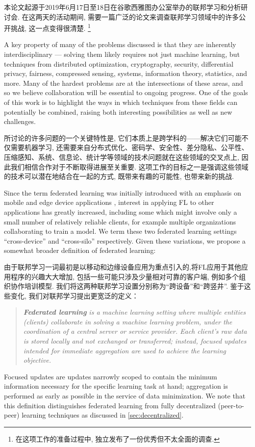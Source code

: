 本论文起源于2019年6月17日至18日在谷歌西雅图办公室举办的联邦学习和分析研讨会. 在这两天的活动期间, 需要一篇广泛的论文来调查联邦学习领域中的许多公开挑战, 这一点变得很清楚. \footnote{在这项工作的准备过程中, \citet{li2019federated}独立发布了一份优秀但不太全面的调查. }


A key property of many of the problems discussed is that they are inherently interdisciplinary --- solving them likely requires not just machine learning, but techniques from distributed optimization, cryptography, security, differential privacy, fairness, compressed sensing, systems, information theory, statistics, and more.  Many of the hardest problems are at the intersections of these areas, and so we believe collaboration will be essential to ongoing progress. One of the goals of this work is to highlight the ways in which techniques from these fields can potentially be combined, raising both interesting possibilities as well as new challenges.

所讨论的许多问题的一个关键特性是, 它们本质上是跨学科的——解决它们可能不仅需要机器学习, 还需要来自分布式优化、密码学、安全性、差分隐私、公平性、压缩感知、系统、信息论、统计学等领域的技术问题就在这些领域的交叉点上, 因此我们相信合作对于不断取得进展至关重要. 这项工作的目标之一是强调这些领域的技术可以潜在地结合在一起的方式, 既带来有趣的可能性, 也带来新的挑战. 


Since the term federated learning was initially introduced with an emphasis on mobile and edge device applications \citep{mcmahan17fedavg,flblog17}, interest in applying FL to other applications has greatly increased, including some which might involve only a small number of relatively reliable clients, for example multiple organizations collaborating to train a model. We term these two federated learning settings ``cross-device'' and  ``cross-silo'' respectively. Given these variations, we propose a somewhat broader definition of federated learning:

由于联邦学习一词最初是以移动和边缘设备应用为重点引入的\citep{mcmahan17fedavg,flblog17},将FL应用于其他应用程序的兴趣大大增加, 包括一些可能只涉及少量相对可靠的客户端, 例如多个组织协作培训模型. 我们将这两种联邦学习设置分别称为“跨设备”和“跨竖井”. 鉴于这些变化, 我们对联邦学习提出更宽泛的定义：

\begin{quote}
\emph{\textbf{Federated learning} is a machine learning setting where multiple entities (clients) collaborate in solving a machine learning problem, under the 
coordination of a central server or service provider. Each client's raw data is stored locally and not exchanged or transferred; instead, focused updates intended for immediate aggregation are used to achieve the learning objective.}
\end{quote}
Focused updates are updates narrowly scoped to contain the minimum information necessary for the specific learning task at hand; aggregation is performed as early as possible in the service of data minimization. We note that this definition distinguishes federated learning from fully decentralized (peer-to-peer) learning techniques as discussed in \cref{sec:decentralized}.

